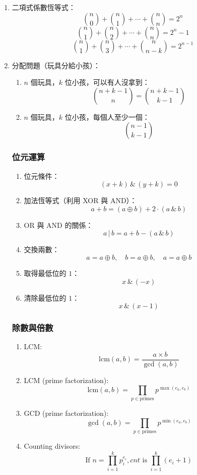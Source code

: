\begin{enumerate}
\item 二項式係數恆等式：
\[
\binom{n}{0} + \binom{n}{1} + \cdots + \binom{n}{n} = 2^n
\]
\[
\binom{n}{1} + \binom{n}{2} + \cdots + \binom{n}{n} = 2^n - 1
\]
\[
\binom{n}{1} + \binom{n}{3} + \cdots + \binom{n}{n - k} = 2^{n - 1}
\]

\item 分配問題（玩具分給小孩）：
\begin{enumerate}\itemsep = -3pt
\item $n$ 個玩具，$k$ 位小孩，可以有人沒拿到：
\[
\binom{n+k-1}{n} = \binom{n+k-1}{k-1}
\]
\item $n$ 個玩具，$k$ 位小孩，每個人至少一個：
\[
\binom{n-1}{k-1}
\]
\end{enumerate}

\subsubsection{位元運算}
\begin{enumerate}\itemsep = -3pt
\item 位元條件：
\[
(x + k) \,\&\, (y + k) = 0
\]

\item 加法恆等式（利用 XOR 與 AND）：
\[
a + b = (a \oplus b) + 2 \cdot (a \,\&\, b)
\]
\item OR 與 AND 的關係：
\[
a \,|\, b = a + b - (a \,\&\, b)
\]
\item 交換兩數：
\[
a = a \oplus b, \quad b = a \oplus b, \quad a = a \oplus b
\]
\item 取得最低位的 $1$：
\[x \,\&\, (-x)
\]
\item 清除最低位的 $1$：
\[x \,\&\, (x - 1)
\]
\end{enumerate}

\subsubsection{除數與倍數}
\begin{enumerate}\itemsep = -3pt
\item LCM:
\[
\text{lcm}(a, b) = \frac{a \times b}{\gcd(a, b)}
\]

\item LCM (prime factorization):
\[
\text{lcm}(a, b) = \prod_{p \in \text{primes}} p^{\max(e_a, e_b)}
\]

\item GCD (prime factorization):
\[
\gcd(a, b) = \prod_{p \in \text{primes}} p^{\min(e_a, e_b)}
\] 

\item Counting divisors:
\[
\text{If } n = \prod_{i=1}^{k} p_i^{e_i},  cnt \text{ is } \prod_{i=1}^{k} (e_i + 1)
\]
\end{enumerate}


\end{enumerate}
